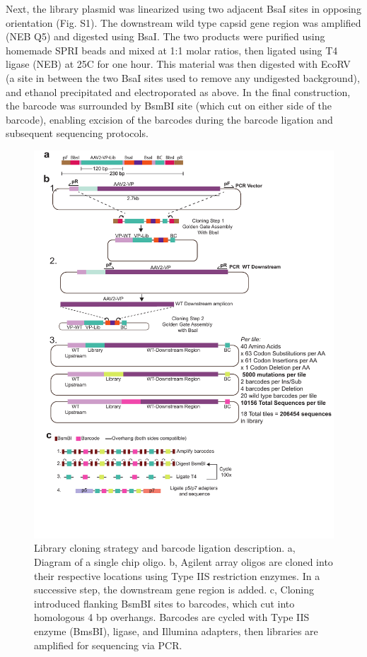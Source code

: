 Next, the library plasmid was linearized using two adjacent BsaI sites in opposing orientation (Fig. S1). The downstream wild type capsid gene region was amplified (NEB Q5) and digested using BsaI. The two products were purified using homemade SPRI beads and mixed at 1:1 molar ratios, then ligated using T4 ligase (NEB) at 25C for one hour. This material was then digested with EcoRV (a site in between the two BsaI sites used to remove any undigested background), and ethanol precipitated and electroporated as above. In the final construction, the barcode was surrounded by BsmBI site (which cut on either side of the barcode), enabling excision of the barcodes during the barcode ligation and subsequent sequencing protocols.

\begin{figure}
\includegraphics[width=\textwidth,height=\textheight]{figures/20180903_AAV2_supp_fig0_cloning.pdf}
\caption[Library cloning strategy and barcode ligation description]{Library cloning strategy and barcode ligation description. a, Diagram of a single chip oligo. b, Agilent array oligos are cloned into their respective locations using Type IIS restriction enzymes. In a successive step, the downstream gene region is added. c, Cloning introduced flanking BsmBI sites to barcodes, which cut into homologous 4 bp overhangs. Barcodes are cycled with Type IIS enzyme (BmsBI), ligase, and Illumina adapters, then libraries are amplified for sequencing via PCR.
\label{fig:Figure 6}}
\end{figure}

